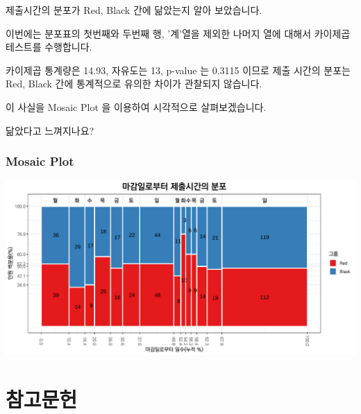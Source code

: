 \documentclass[
]{book}
\begin{document}
제출시간의 분포가 Red, Black 간에 닮았는지 알아 보았습니다.

이번에는 분포표의 첫번째와 두번째 행, '계'열을 제외한 나머지 열에 대해서 카이제곱테스트를 수행합니다.

카이제곱 통계량은 14.93, 자유도는 13, p-value 는 0.3115 이므로 제출 시간의 분포는 Red, Black 간에 통계적으로 유의한 차이가 관찰되지 않습니다.

이 사실을 Mosaic Plot 을 이용하여 시각적으로 살펴보겠습니다.

닮았다고 느껴지나요?

\subsection{Mosaic Plot}\label{mosaic-plot-30}

\includegraphics{Quiz_report_2025_files/figure-latex/unnamed-chunk-414-1.pdf}

\chapter*{참고문헌}\label{uxcc38uxace0uxbb38uxd5cc}
\end{document}
